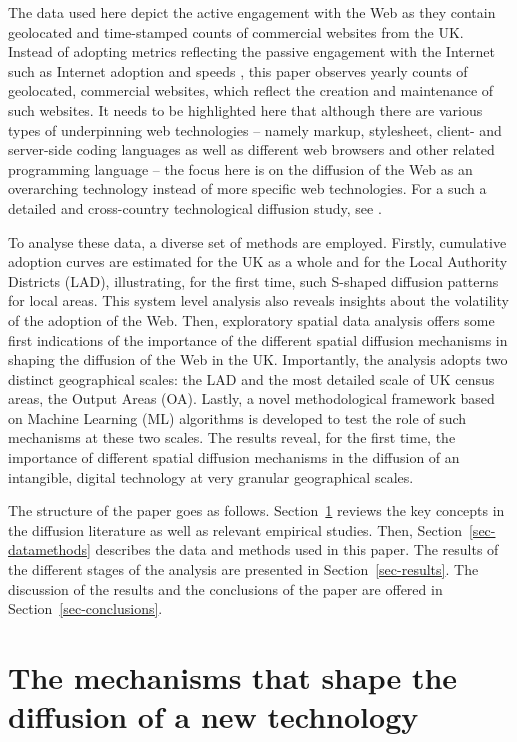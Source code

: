 \documentclass[
  authoryear,
  preprint,
  3p]{elsarticle}
\begin{document}
The data used here depict the active engagement with the Web as they
contain geolocated and time-stamped counts of commercial websites from
the UK. Instead of adopting metrics reflecting the passive engagement
with the Internet such as Internet adoption and speeds
\citep[e.g.][]{blank2018local, destefano2022fuzzy}, this paper observes
yearly counts of geolocated, commercial websites, which reflect the
creation and maintenance of such websites. It needs to be highlighted
here that although there are various types of underpinning web
technologies -- namely markup, stylesheet, client- and server-side
coding languages as well as different web browsers and other related
programming language -- the focus here is on the diffusion of the Web as
an overarching technology instead of more specific web technologies. For
a such a detailed and cross-country technological diffusion study, see
\citet{PAPAGIANNIDIS2015308}.

To analyse these data, a diverse set of methods are employed. Firstly,
cumulative adoption curves are estimated for the UK as a whole and for
the Local Authority Districts (LAD), illustrating, for the first time,
such S-shaped diffusion patterns for local areas. This system level
analysis also reveals insights about the volatility of the adoption of
the Web. Then, exploratory spatial data analysis offers some first
indications of the importance of the different spatial diffusion
mechanisms in shaping the diffusion of the Web in the UK. Importantly,
the analysis adopts two distinct geographical scales: the LAD and the
most detailed scale of UK census areas, the Output Areas (OA). Lastly, a
novel methodological framework based on Machine Learning (ML) algorithms
is developed to test the role of such mechanisms at these two scales.
The results reveal, for the first time, the importance of different
spatial diffusion mechanisms in the diffusion of an intangible, digital
technology at very granular geographical scales.

The structure of the paper goes as follows. Section~\ref{sec-litreview}
reviews the key concepts in the diffusion literature as well as relevant
empirical studies. Then, Section~\ref{sec-datamethods} describes the
data and methods used in this paper. The results of the different stages
of the analysis are presented in Section~\ref{sec-results}. The
discussion of the results and the conclusions of the paper are offered
in Section~\ref{sec-conclusions}.

\section{The mechanisms that shape the diffusion of a new
technology}\label{sec-litreview}
\end{document}
